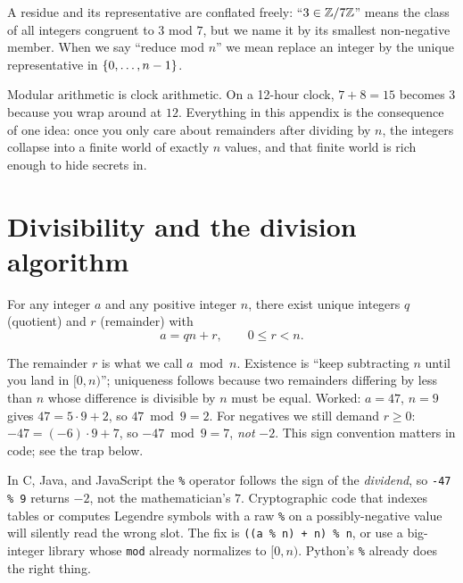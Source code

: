 A residue and its representative are conflated freely: ``$3 \in \mathbb{Z}/7\mathbb{Z}$'' means the class of all
integers congruent to $3$ mod $7$, but we name it by its smallest non-negative member. When we say
``reduce mod $n$'' we mean replace an integer by the unique representative in $\{0,\dots,n-1\}$.

\begin{intuitionbox}
Modular arithmetic is clock arithmetic. On a 12-hour clock, $7 + 8 = 15$ becomes $3$ because you
wrap around at $12$. Everything in this appendix is the consequence of one idea: once you only care
about remainders after dividing by $n$, the integers collapse into a finite world of exactly $n$
values, and that finite world is rich enough to hide secrets in.
\end{intuitionbox}

\section{Divisibility and the division algorithm}
\label{ch40:division}

\begin{theorem}
\label{ch40:thm-division}
For any integer $a$ and any positive integer $n$, there exist unique integers $q$ (quotient) and
$r$ (remainder) with
\[
  a = qn + r, \qquad 0 \le r < n.
\]
\end{theorem}

The remainder $r$ is what we call $a \bmod n$. Existence is ``keep subtracting $n$ until you
land in $[0,n)$''; uniqueness follows because two remainders differing by less than $n$ whose
difference is divisible by $n$ must be equal. Worked: $a = 47$, $n = 9$ gives $47 = 5\cdot 9 + 2$, so
$47 \bmod 9 = 2$. For negatives we still demand $r \ge 0$: $-47 = (-6)\cdot 9 + 7$, so
$-47 \bmod 9 = 7$, \emph{not} $-2$. This sign convention matters in code; see the trap below.

\begin{trapbox}
In C, Java, and JavaScript the \texttt{\%} operator follows the sign of the \emph{dividend}, so
\texttt{-47 \% 9} returns $-2$, not the mathematician's $7$. Cryptographic code that indexes tables
or computes Legendre symbols with a raw \texttt{\%} on a possibly-negative value will silently read
the wrong slot. The fix is \texttt{((a \% n) + n) \% n}, or use a big-integer library whose
\texttt{mod} already normalizes to $[0,n)$. Python's \texttt{\%} already does the right thing.
\end{trapbox}

